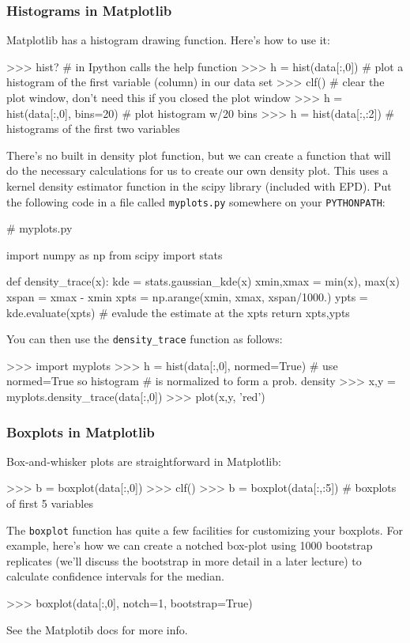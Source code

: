 \subsubsection{Histograms in Matplotlib}

Matplotlib has a histogram drawing function. Here's how to use it:
%
\begin{python}
>>> hist? # in Ipython calls the help function
>>> h = hist(data[:,0]) # plot a histogram of the first variable (column) in our data set
>>> clf() # clear the plot window, don't need this if you closed the plot window
>>> h = hist(data[:,0], bins=20) # plot histogram w/20 bins
>>> h = hist(data[:,:2])  # histograms of the first two variables    
\end{python}

There's no built in density plot function, but we can create a function
that will do the necessary calculations for us to create our own density
plot. This uses a kernel density estimator function in the scipy library
(included with EPD). Put the following code in a file called
\lstinline!myplots.py! somewhere on your \lstinline!PYTHONPATH!:
%
\begin{python}
# myplots.py

import numpy as np
from scipy import stats

def density_trace(x):
    kde = stats.gaussian_kde(x)
    xmin,xmax = min(x), max(x)
    xspan = xmax - xmin
    xpts = np.arange(xmin, xmax, xspan/1000.)
    ypts = kde.evaluate(xpts) # evalude the estimate at the xpts
    return xpts,ypts
\end{python}

You can then use the \lstinline!density_trace! function as follows:
%
\begin{python}
>>> import myplots
>>> h = hist(data[:,0], normed=True) # use normed=True so histogram 
                           # is normalized to form a prob. density
>>> x,y = myplots.density_trace(data[:,0])
>>> plot(x,y, 'red')    
\end{python}

\subsubsection{Boxplots in Matplotlib}

Box-and-whisker plots are straightforward in Matplotlib:
%
\begin{python}
>>> b = boxplot(data[:,0])
>>> clf()
>>> b = boxplot(data[:,:5]) # boxplots of first 5 variables
\end{python}
%
The \lstinline!boxplot! function has quite a few facilities for
customizing your boxplots. For example, here's how we can create a
notched box-plot using 1000 bootstrap replicates (we'll discuss the
bootstrap in more detail in a later lecture) to calculate confidence
intervals for the median.
%
\begin{python}
>>> boxplot(data[:,0], notch=1, bootstrap=True)    
\end{python}
See the Matplotib docs for more info.

